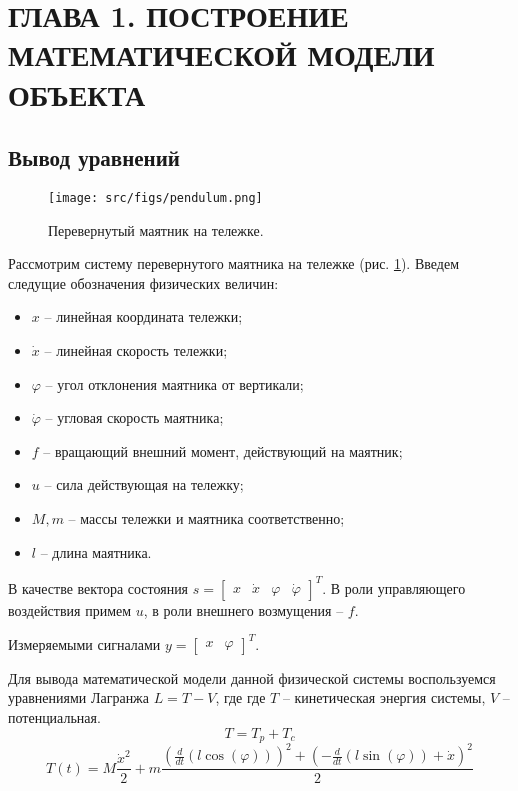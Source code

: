 \section{ГЛАВА 1. ПОСТРОЕНИЕ МАТЕМАТИЧЕСКОЙ МОДЕЛИ ОБЪЕКТА}

\subsection{Вывод уравнений}

\begin{figure}[h]
  \centering
  \texttt{[image: src/figs/pendulum.png]}
  \caption{\label{fig:task1_1}Перевернутый маятник на тележке.}
\end{figure}

Рассмотрим систему перевернутого маятника на тележке (рис. \ref{fig:task1_1}). Введем следущие обозначения физических величин:
\begin{itemize}
  \item $x$ -- линейная координата тележки;
  \item $\dot{x}$ -- линейная скорость тележки;
  \item $\varphi$ -- угол отклонения маятника от вертикали;
  \item $\dot{\varphi}$ -- угловая скорость маятника;
  \item $f$ -- вращающий внешний момент, действующий на маятник;
  \item $u$ -- сила действующая на тележку;
  \item $M, m$ --  массы тележки и маятника соответственно;
  \item $l$ -- длина маятника.
\end{itemize}

В качестве вектора состояния \(s = \begin{bmatrix} x & \dot{x} & \varphi & \dot{\varphi}\end{bmatrix}^T\). 
В роли управляющего воздействия примем $u$, в роли внешнего возмущения -- $f$.

Измеряемыми сигналами \(y = \begin{bmatrix} x & \varphi \end{bmatrix}^T\).

Для вывода математической модели данной физической системы воспользуемся уравнениями Лагранжа \(L = T - V\), где где $T$ -- кинетическая энергия системы, $V$ -- потенциальная.
\[T = T_p + T_c\]
\[
T(t) = M\frac{\dot{x}^2}{2} + m\frac{(\frac{d}{dt}(l\cos(\varphi)))^2 + (-\frac{d}{dt}(l\sin(\varphi)) + \dot{x})^2}{2}
\]

